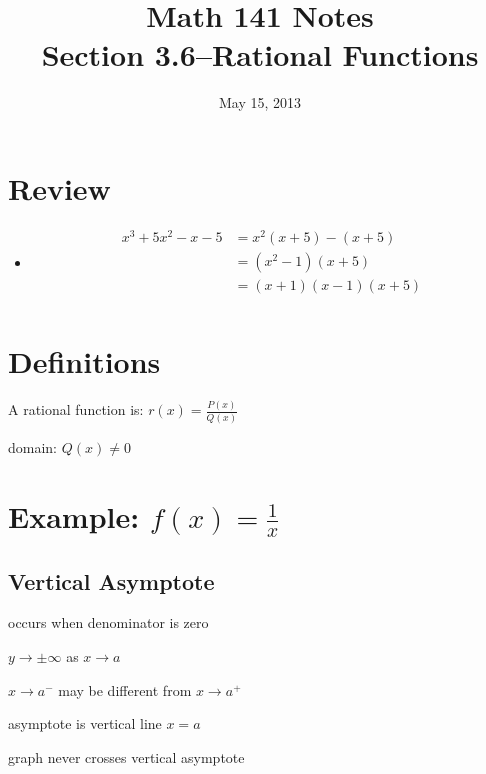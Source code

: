 \documentclass{exam}
\title{Math 141 Notes \\ Section 3.6--Rational Functions}
\date{May 15, 2013}
\begin{document}
  \maketitle
  \tableofcontents

  \pagebreak

  \section{Review}
  \begin{itemize}
    \item 
      \begin{align*}
        x^3 + 5x^2 - x - 5 &= x^2(x + 5) - (x + 5) \\
                           &= \left( x^2 - 1 \right) (x + 5) \\
                           &= (x + 1)(x - 1)(x + 5) \\
      \end{align*}
  \end{itemize}

  \section{Definitions}

  \begin{itemize*}
    \item A rational function is: $r(x) = \frac{P(x)}{Q(x)}$
    \item domain: $Q(x) \neq 0$
  \end{itemize*}

  \section{Example: $f(x) = \frac{1}{x}$}

  \subsection{Vertical Asymptote}
  \begin{itemize*}
    \item occurs when denominator is zero
    \item $y \rightarrow \pm \infty$ as $x \rightarrow a$
    \item $x \rightarrow a^-$ may be different from $x \rightarrow a^+$
    \item asymptote is vertical line $x = a$
    \item graph never crosses vertical asymptote
  \end{itemize*}
\end{document}
